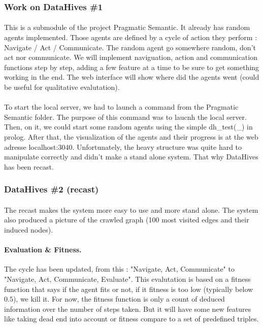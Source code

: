 \documentclass{article}
\begin{document}
		\subsubsection{Work on DataHives \#1}
			\paragraph{} This is a submodule of the project Pragmatic Semantic.
			It already has random agents implemented.
			Those agents are defined by a cycle of action they perform : Navigate / Act / Communicate.
			The random agent go somewhere random, don't act nor communicate.
			We will implement naviguation, action and communication functions step by step,
			adding a few feature at a time to be sure to get something working in the end.
			The web interface will show where did the agents went (could be useful for qualitative evalutation).
			\paragraph{} To start the local server, we had to launch a command from the Pragmatic Semantic folder.
			The purpose of this command was to laucnh the local server.
			Then, on it, we could start some random agents using the simple dh\_test(\_) in prolog.
			After that, the visualization of the agents and their progress is at the web adresse localhost:3040.
			Unfortunately, the heavy structure was quite hard to manipulate correctly and didn't make a stand alone system.
			That why DataHives has been recast.
		\subsubsection{DataHives \#2 (recast)}
			\paragraph{} The recast makes the system more easy to use and more stand alone.
				The system also produced a picture of the crawled graph (100 most visited edges and their induced nodes).
			\paragraph{Evaluation \& Fitness.} The cycle has been updated, from this :
				"Navigate, Act, Communicate" to "Navigate, Act, Communicate, Evaluate".
				This evalutation is based on a fitness function that says if the agent fits or not,
				if it fitness is too low (typically below $0.5$), we kill it.
				For now, the fitness function is only a count of deduced information over the number of steps taken.
				But it will have some new features like taking dead end into account or
				fitness compare to a set of predefined triples.
\end{document}
